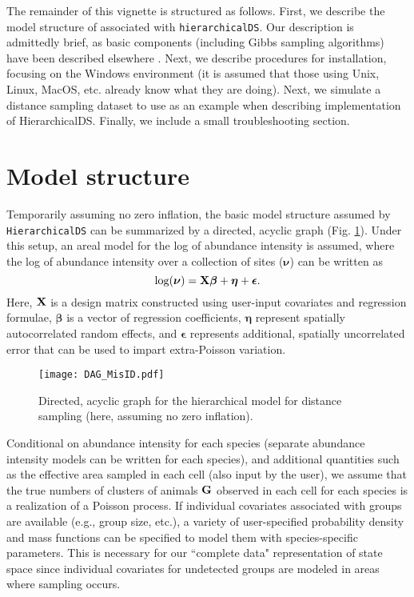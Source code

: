 \documentclass{article}\usepackage{graphicx, color}
\begin{document}
The remainder of this vignette is structured as follows.  First, we describe the model structure of
associated with \texttt{hierarchicalDS}. Our description is admittedly brief, as basic components (including Gibbs sampling algorithms) have been described elsewhere \citep[e.g.][]{ConnEtAl2012,ConnEtAl2013}.  Next, we describe procedures for installation,
focusing on the Windows environment (it is assumed that those using Unix, Linux, MacOS, etc. already know what they are doing).  Next, we simulate a distance sampling dataset to use as an example when describing implementation of HierarchicalDS.  Finally, we include a small troubleshooting section.


\section{Model structure}

Temporarily assuming no zero inflation, the basic model structure assumed by \texttt{HierarchicalDS} can be summarized by a directed, acyclic graph
(Fig. \ref{fig:DAG}).
Under this setup, an areal model for the log of abundance intensity is assumed, where the log of abundance intensity over a collection of sites ($\boldsymbol{\nu}$) can be written as 
$$
  \log(\boldsymbol{\nu})={\bf X}\boldsymbol{\beta}+\boldsymbol{\eta}+\boldsymbol{\epsilon}.
$$
Here, ${\bf X}$ is a design matrix constructed using user-input covariates and regression formulae, $\boldsymbol{\beta}$ is a vector of regression coefficients, $\boldsymbol{\eta}$ represent spatially autocorrelated random effects, and $\boldsymbol{\epsilon}$ represents additional, spatially uncorrelated error that can be used to impart extra-Poisson variation.

\begin{figure}
\begin{center}
\texttt{[image: DAG\_MisID.pdf]}
\end{center}
\caption{Directed, acyclic graph for the hierarchical model for distance sampling (here, assuming no zero inflation).}
\label{fig:DAG}
\end{figure}


Conditional on abundance intensity for each species (separate abundance intensity models can be written for each species), and additional quantities such as the effective area sampled in each cell (also input by the user), we assume that the true numbers of clusters of animals ${\bf G}$ observed in each cell for each species is a realization of a Poisson process.  If individual covariates associated with groups are available (e.g., group size, etc.), a variety of user-specified probability density and mass functions can be specified to model them with species-specific parameters. This is necessary for our ``complete data" \citep{Dempster1977} representation of state space since individual covariates for undetected groups are modeled in areas where sampling occurs.
\end{document}
